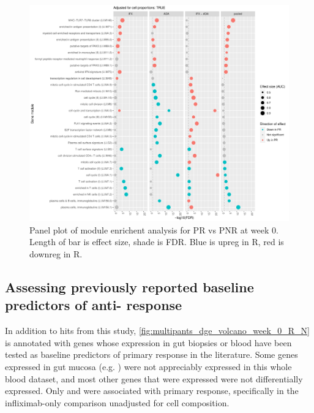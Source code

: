 \begin{outline}
\begin{figure}
    \centering
    \includegraphics[width=1.0\textwidth,page=1]{mainmatter/figures/chapter_04/plot_gene_set_enrichment.tmodCERNO_panelplot_reversed_C_1RI_1NI,C_1RA_1NA,C_(1RI_1NI)_(1RA_1NA),C_1R_1N.cell_prop_correction_TRUE.pdf}
    \caption{Panel plot of module enrichent analysis for PR vs PNR at week 0. Length of bar is effect size, shade is FDR. Blue is upreg in R, red is downreg in R.}
    \label{fig:multipants_dge_panelPlot_week_0_R_N_cellPropT}
\end{figure}

\subsection{Assessing previously reported baseline predictors of anti- response}

In addition to hits from this study, \autoref{fig:multipants_dge_volcano_week_0_R_N} is annotated with genes whose expression in gut biopsies or blood have been tested as baseline predictors of primary response in the literature\autocite{arijs2009MucosalGeneSignatures,arijs2010PredictiveValueEpithelial,verstockt2019LowTREM1Expression,salvador-martin2020GeneSignaturesEarly}.
Some genes expressed in gut mucosa (e.g. ) were not appreciably expressed in this whole blood dataset, 
and most other genes that were expressed were not differentially expressed.
Only  and  were associated with primary response, specifically in the infliximab-only comparison unadjusted for cell composition.


\end{outline}

